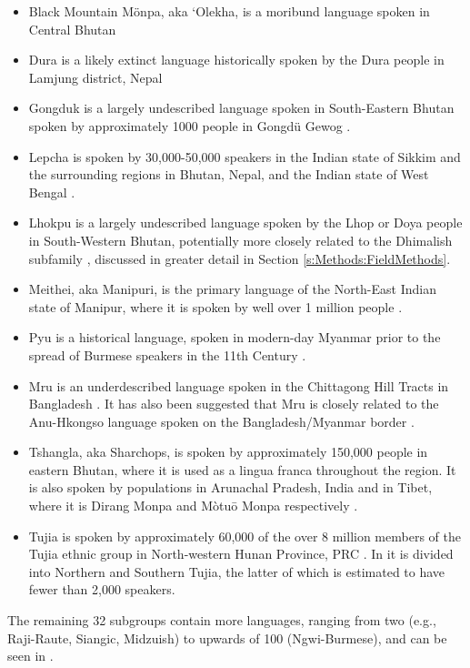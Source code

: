 \begin{itemize}
    \item Black Mountain Mönpa, aka `Olekha, is a moribund language spoken in Central Bhutan \cite{Hyslop2016}
    \item Dura is a likely extinct language historically spoken by the Dura people in Lamjung district, Nepal \cite{Schorer2016}
    \item Gongduk is a largely undescribed language spoken in South-Eastern Bhutan spoken by approximately 1000 people in Gongdü Gewog \cite{Bodt2012}.
    \item Lepcha is spoken by 30,000-50,000 speakers in the Indian state of Sikkim and the surrounding regions in Bhutan, Nepal, and the Indian state of West Bengal \cite{Plaisier2007}.
    \item Lhokpu is a largely undescribed language spoken by the Lhop or Doya people in South-Western Bhutan, potentially more closely related to the Dhimalish subfamily \cites{Bodt2012}{Grollmann2018}, discussed in greater detail in Section \ref{s:Methods:FieldMethods}.
    \item Meithei, aka Manipuri, is the primary language of the North-East Indian state of Manipur, where it is spoken by well over 1 million people \cite{Chelliah1997}.
    \item Pyu is a historical language, spoken in modern-day Myanmar prior to the spread of Burmese speakers in the 11th Century \cite{Miyake2019}.
    \item Mru is an underdescribed language spoken in the Chittagong Hill Tracts in Bangladesh \cite{VanDriem2014}. It has also been suggested that Mru is closely related to the Anu-Hkongso language spoken on the Bangladesh/Myanmar border \cite{Peterson2017}.
    \item Tshangla, aka Sharchops, is spoken by approximately 150,000 people in eastern Bhutan, where it is used as a lingua franca throughout the region. It is also spoken by populations in Arunachal Pradesh, India and in Tibet, where it is Dirang Monpa and Mòtuō Monpa respectively \cite{Andvik2010}.
    \item Tujia is spoken by approximately 60,000 of the over 8 million members of the Tujia ethnic group in North-western Hunan Province, PRC \cite{Brassett2006}. In  it is divided into Northern and Southern Tujia, the latter of which is estimated to have fewer than 2,000 speakers.
\end{itemize}

The remaining 32 subgroups contain more languages, ranging from two (e.g., Raji-Raute, Siangic, Midzuish) to upwards of 100 (Ngwi-Burmese), and can be seen in .

